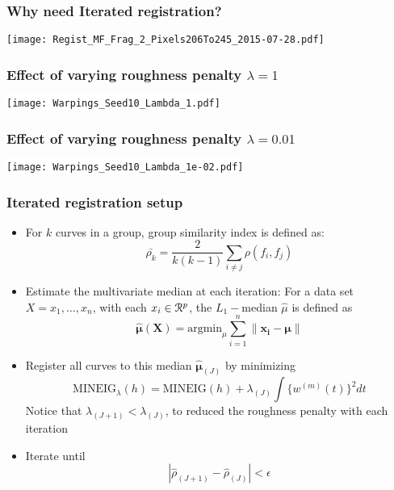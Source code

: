 \documentclass[10pt,dvipsnames,table, notes]{beamer} %
\begin{document}
\begin{frame}
\frametitle{Why need Iterated registration?}
\begin{center}
\texttt{[image: Regist\_MF\_Frag\_2\_Pixels206To245\_2015-07-28.pdf]}
\end{center}

\end{frame}

\begin{frame}
\frametitle{Effect of varying roughness penalty $\lambda = 1$}
\begin{center}
\colorbox{white}{\texttt{[image: Warpings\_Seed10\_Lambda\_1.pdf]}}
\end{center}
\end{frame}

\begin{frame}
\frametitle{Effect of varying roughness penalty $\lambda = 0.01$}
\begin{center}
\colorbox{white}{\texttt{[image: Warpings\_Seed10\_Lambda\_1e-02.pdf]}}
\end{center}
\end{frame}

\begin{frame}
\frametitle{Iterated registration setup}
\begin{itemize}
\item For $k$ curves in a group, group similarity index is defined as:
\[ \bar{\rho_k} = \frac{2}{k(k-1)}\sum \limits_{i \ne j} \rho(f_i, f_j)\] 

 \item Estimate the multivariate median at each iteration: For a data set $X = {x_1, \dots, x_n}$, with each $x_i \in \mathcal{R}^p$, the $L_1-$median $\hat{\mu}$ is defined as 
\[ \hat{\boldsymbol{\mu}}(\mathbf{X}) = \text{argmin}_{\mu} \sum\limits_{i = 1}^{n}\|\mathbf{x_i} - \boldsymbol{\mu} \|\]

 \item Register all curves to this median $\hat{\boldsymbol{\mu}}_{(J)}$ by minimizing
\[ \text{MINEIG}_{\lambda}(h) = \text{MINEIG}(h) + \lambda_{(J)} \int \{w^{(m)}(t)\}^2 dt \]
Notice that $\lambda_{(J+1)} < \lambda_{(J)}$, to reduced the roughness penalty with each iteration

 \item Iterate until 
\[ |\hat{\rho}_{(J+1)} - \hat{\rho}_{(J)}| < \epsilon \]
\end{itemize}
\end{frame}
\end{document}
